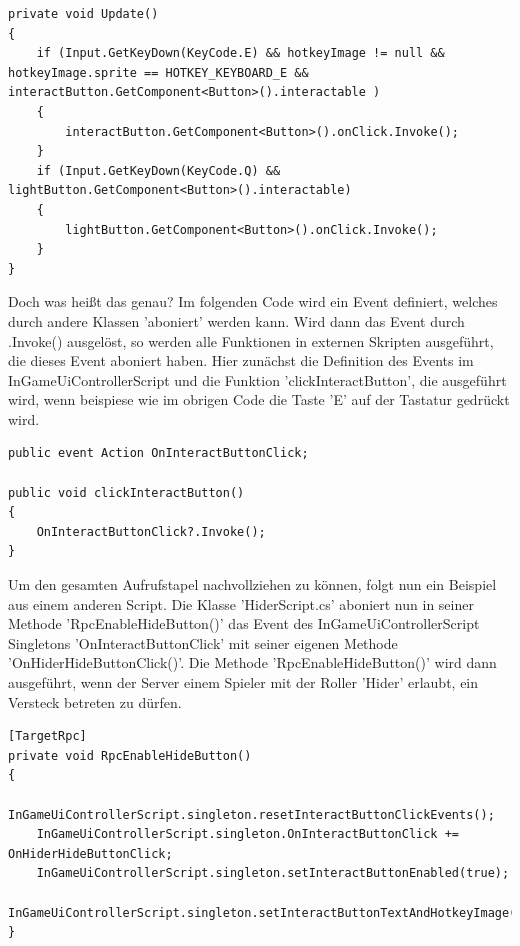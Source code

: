 \begin{lstlisting}[caption= InGameUiControllerScript.cs Update Method]
private void Update()
{
	if (Input.GetKeyDown(KeyCode.E) && hotkeyImage != null && hotkeyImage.sprite == HOTKEY_KEYBOARD_E && interactButton.GetComponent<Button>().interactable )
	{
		interactButton.GetComponent<Button>().onClick.Invoke();
	}
	if (Input.GetKeyDown(KeyCode.Q) && lightButton.GetComponent<Button>().interactable)
	{
		lightButton.GetComponent<Button>().onClick.Invoke();
	}
}
\end{lstlisting}

Doch was heißt das genau? Im folgenden Code wird ein Event definiert, welches durch andere Klassen 'aboniert' werden kann. Wird dann das Event durch .Invoke() ausgelöst, so werden alle Funktionen in externen Skripten ausgeführt, die dieses Event aboniert haben. Hier zunächst die Definition des Events im InGameUiControllerScript und die Funktion 'clickInteractButton', die ausgeführt wird, wenn beispiese wie im obrigen Code die Taste 'E' auf der Tastatur gedrückt wird.

\begin{lstlisting}[caption= InGameUiControllerScript.cs OnInteractButtonClick Event]
public event Action OnInteractButtonClick;	

public void clickInteractButton()
{
	OnInteractButtonClick?.Invoke();
}
\end{lstlisting}

Um den gesamten Aufrufstapel\cite{Wikipedia.2021k} nachvollziehen zu können, folgt nun ein Beispiel aus einem anderen Script.
Die Klasse 'HiderScript.cs' aboniert nun in seiner Methode 'RpcEnableHideButton()' das Event des InGameUiControllerScript Singletons 'OnInteractButtonClick' mit seiner eigenen Methode 'OnHiderHideButtonClick()'. Die Methode 'RpcEnableHideButton()' wird dann ausgeführt, wenn der Server einem Spieler mit der Roller 'Hider' erlaubt, ein Versteck betreten zu dürfen.

\begin{lstlisting}[caption= HiderScript.cs Subscribe to InGameUiControllerScript Event]
[TargetRpc]
private void RpcEnableHideButton()
{
	InGameUiControllerScript.singleton.resetInteractButtonClickEvents();
	InGameUiControllerScript.singleton.OnInteractButtonClick += OnHiderHideButtonClick;
	InGameUiControllerScript.singleton.setInteractButtonEnabled(true);
	InGameUiControllerScript.singleton.setInteractButtonTextAndHotkeyImage('Hide');
}
\end{lstlisting}

